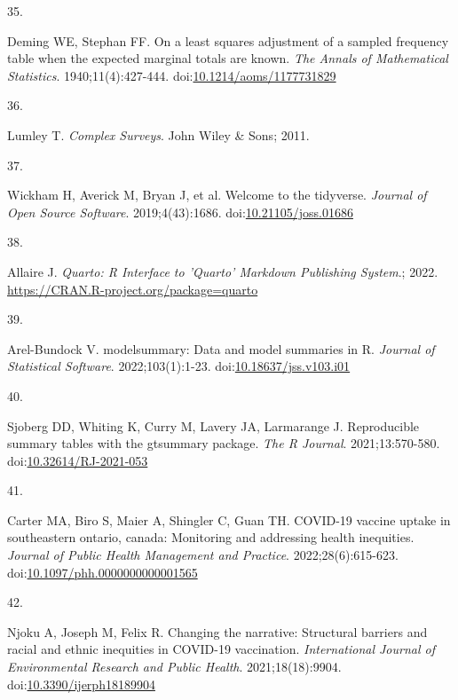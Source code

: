 \documentclass[
  letterpaper,
  DIV=11,
  numbers=noendperiod]{scrartcl}
\newlength{\cslhangindent}
\newlength{\csllabelwidth}
\newlength{\cslentryspacingunit} %
\newenvironment{CSLReferences}[2] %
 {%
  \setlength{\parindent}{0pt}
  \ifodd #1
  \let\oldpar\par
  \def\par{\hangindent=\cslhangindent\oldpar}
  \fi
  \setlength{\parskip}{#2\cslentryspacingunit}
 }%
 {}
\newcommand{\CSLLeftMargin}[1]{\parbox[t]{\csllabelwidth}{#1}}
\newcommand{\CSLRightInline}[1]{\parbox[t]{\linewidth - \csllabelwidth}{#1}\break}
\begin{document}
\begin{CSLReferences}{0}{0}
\leavevmode{}%
\CSLLeftMargin{35. }%
\CSLRightInline{Deming WE, Stephan FF. On a least squares adjustment of
a sampled frequency table when the expected marginal totals are known.
\emph{The Annals of Mathematical Statistics}. 1940;11(4):427-444.
doi:\href{https://doi.org/10.1214/aoms/1177731829}{10.1214/aoms/1177731829}}

\leavevmode{}%
\CSLLeftMargin{36. }%
\CSLRightInline{Lumley T. \emph{Complex Surveys}. John Wiley \& Sons;
2011.}

\leavevmode{}%
\CSLLeftMargin{37. }%
\CSLRightInline{Wickham H, Averick M, Bryan J, et al. Welcome to the
{tidyverse}. \emph{Journal of Open Source Software}. 2019;4(43):1686.
doi:\href{https://doi.org/10.21105/joss.01686}{10.21105/joss.01686}}

\leavevmode{}%
\CSLLeftMargin{38. }%
\CSLRightInline{Allaire J. \emph{Quarto: R Interface to 'Quarto'
Markdown Publishing System}.; 2022.
\url{https://CRAN.R-project.org/package=quarto}}

\leavevmode{}%
\CSLLeftMargin{39. }%
\CSLRightInline{Arel-Bundock V. {modelsummary}: Data and model summaries
in {R}. \emph{Journal of Statistical Software}. 2022;103(1):1-23.
doi:\href{https://doi.org/10.18637/jss.v103.i01}{10.18637/jss.v103.i01}}

\leavevmode{}%
\CSLLeftMargin{40. }%
\CSLRightInline{Sjoberg DD, Whiting K, Curry M, Lavery JA, Larmarange J.
Reproducible summary tables with the gtsummary package. \emph{{The R
Journal}}. 2021;13:570-580.
doi:\href{https://doi.org/10.32614/RJ-2021-053}{10.32614/RJ-2021-053}}

\leavevmode{}%
\CSLLeftMargin{41. }%
\CSLRightInline{Carter MA, Biro S, Maier A, Shingler C, Guan TH.
{COVID}-19 vaccine uptake in southeastern ontario, canada: Monitoring
and addressing health inequities. \emph{Journal of Public Health
Management and Practice}. 2022;28(6):615-623.
doi:\href{https://doi.org/10.1097/phh.0000000000001565}{10.1097/phh.0000000000001565}}

\leavevmode{}%
\CSLLeftMargin{42. }%
\CSLRightInline{Njoku A, Joseph M, Felix R. Changing the narrative:
Structural barriers and racial and ethnic inequities in {COVID}-19
vaccination. \emph{International Journal of Environmental Research and
Public Health}. 2021;18(18):9904.
doi:\href{https://doi.org/10.3390/ijerph18189904}{10.3390/ijerph18189904}}


\end{CSLReferences}
\end{document}
